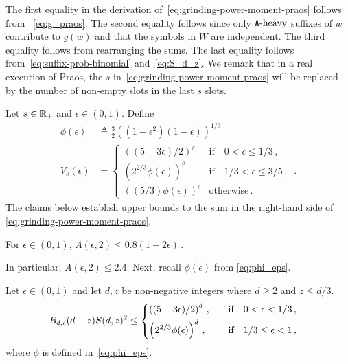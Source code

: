 The first equality in the derivation of~\eqref{eq:grinding-power-moment-praos} follows from 
~\eqref{eq:g_praos}. 
The second equality follows 
since only $\mathtt{A}\text{-heavy}$ suffixes of $w$ contribute to $g(w)$ 
and that the symbols in $W$ are independent. 
The third equality follows from rearranging the sums. 
The last equality follows from~\eqref{eq:suffix-prob-binomial} 
and~\eqref{eq:S_d_z}. 
We remark that in a real execution of Praos, 
the $s$ in~\eqref{eq:grinding-power-moment-praos} 
will be replaced by 
the number of non-empty slots in the last $s$ slots. 


Let $s \in \mathbb{R}_+$ and $\epsilon \in (0,1)$. 
Define 
\begin{align}
  \phi(\epsilon) &\triangleq \frac{3}{2} \left( (1-\epsilon^2) (1-\epsilon) \right)^{1/3}\label{eq:phi_eps} \\
  V_s(\epsilon) &= \begin{cases}
      \left( (5-3 \epsilon)/2 \right)^s & \text{if}\quad 0 < \epsilon \leq 1/3\,, \\
      \left( 2^{2/3} \phi(\epsilon) \right)^s & \text{if}\quad 1/3 < \epsilon \leq 3/5\,, \\
      \left( (5/3) \phi(\epsilon) \right)^s & \text{otherwise}\,. 
    \end{cases} 
  \,. \label{eq:V-eps-praos}
\end{align}
\noindent
The claims below establish upper bounds to the 
sum in the right-hand side of \eqref{eq:grinding-power-moment-praos}.

\begin{claim}\label{claim:multiple-honest-blocks}
  For $\epsilon \in (0, 1)$, 
  $
    A(\epsilon, 2) 
    \leq 0.8 (1 + 2 \epsilon)
    \,.
  $
\end{claim}
\noindent
In particular, $A(\epsilon, 2) \leq 2.4$. Next, recall $\phi(\epsilon)$ from  \eqref{eq:phi_eps}.

\begin{claim}\label{claim:t1star-variance-exact}
  Let $\epsilon \in (0,1)$ and 
  let $d,z$ be non-negative integers where $d \geq 2$ and $z \leq d/3$. 
  \begin{align*}
    B_{d, \epsilon}(d-z) S(d,z)^2
    &\leq \begin{dcases} 
    \left( (5-3 \epsilon)/2 \right)^d \,,
        &\quad \text{if}\quad
        0 < \epsilon < 1/3 \,, \\
    \left( 2^{2/3} \phi(\epsilon) \right)^d \,,
        &\quad \text{if}\quad
        1/3 \leq \epsilon < 1 \, ,
    \end{dcases}
  \end{align*}
  where $\phi$ is defined in~\eqref{eq:phi_eps}.
\end{claim}

